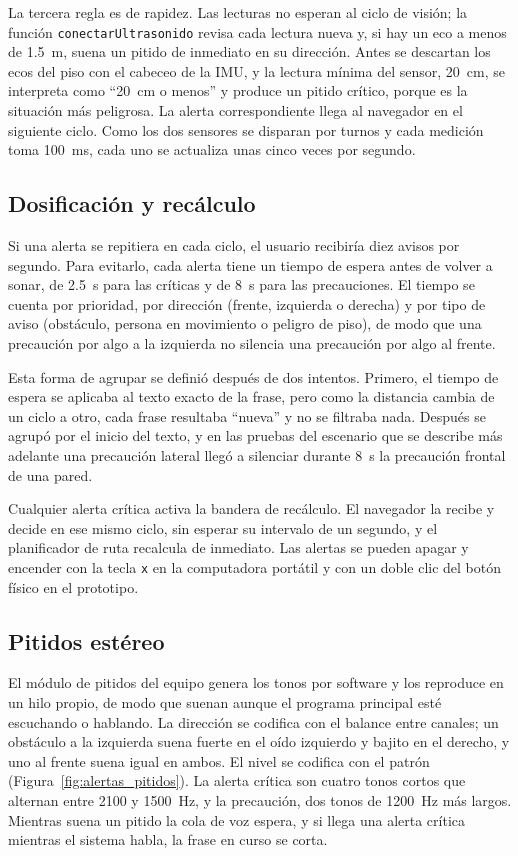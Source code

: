 La tercera regla es de rapidez. Las lecturas no esperan al ciclo de visión; la función
\texttt{conectarUltrasonido} revisa cada lectura nueva y, si hay un eco a menos de 1.5~m,
suena un pitido de inmediato en su dirección. Antes se descartan los ecos del piso con
el cabeceo de la IMU, y la lectura mínima del sensor, 20~cm, se interpreta como ``20~cm
o menos'' y produce un pitido crítico, porque es la situación más peligrosa. La alerta
correspondiente llega al navegador en el siguiente ciclo. Como los dos sensores se
disparan por turnos y cada medición toma 100~ms, cada uno se actualiza unas cinco veces
por segundo.

\subsection{Dosificación y recálculo}

Si una alerta se repitiera en cada ciclo, el usuario recibiría diez avisos por segundo.
Para evitarlo, cada alerta tiene un tiempo de espera antes de volver a sonar, de 2.5~s
para las críticas y de 8~s para las precauciones. El tiempo se cuenta por prioridad,
por dirección (frente, izquierda o derecha) y por tipo de aviso (obstáculo, persona en
movimiento o peligro de piso), de modo que una precaución por algo a la izquierda no
silencia una precaución por algo al frente.

Esta forma de agrupar se definió después de dos intentos. Primero, el tiempo de espera
se aplicaba al texto exacto de la frase, pero como la distancia cambia de un ciclo a
otro, cada frase resultaba ``nueva'' y no se filtraba nada. Después se agrupó por el
inicio del texto, y en las pruebas del escenario que se describe más adelante una
precaución lateral llegó a silenciar durante 8~s la precaución frontal de una pared.

Cualquier alerta crítica activa la bandera de recálculo. El navegador la recibe y decide
en ese mismo ciclo, sin esperar su intervalo de un segundo, y el planificador de ruta
recalcula de inmediato. Las alertas se pueden apagar y encender con la tecla \texttt{x}
en la computadora portátil y con un doble clic del botón físico en el prototipo.

\subsection{Pitidos estéreo}

El módulo de pitidos del equipo genera los tonos por software y los reproduce en un hilo
propio, de modo que suenan aunque el programa principal esté escuchando o hablando. La
dirección se codifica con el balance entre canales; un obstáculo a la izquierda suena
fuerte en el oído izquierdo y bajito en el derecho, y uno al frente suena igual en ambos.
El nivel se codifica con el patrón (Figura~\ref{fig:alertas_pitidos}). La alerta
crítica son cuatro tonos cortos que alternan entre 2100 y 1500~Hz, y la precaución, dos
tonos de 1200~Hz más largos. Mientras suena un pitido la cola de voz espera, y si llega
una alerta crítica mientras el sistema habla, la frase en curso se corta.

